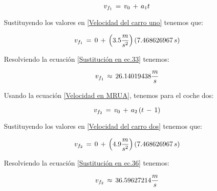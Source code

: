 \documentclass[letterpaper, 12pt]{article}
\begin{document}
\begin{enumerate}
\begin{enumerate}
            \begin{equation}
                \label{Velocidad del carro uno}
                v_{f_{1}} \thinspace = \thinspace v_{0} \thinspace + \thinspace a_{1}t 
            \end{equation}
            
            Sustituyendo los valores en \ref{Velocidad del carro uno} tenemos que:
            
            \begin{equation}
                \label{Sustitución en ec.33}
                v_{f_{1}} \thinspace = \thinspace 0 \thinspace + \thinspace \left(3.5 \frac{m}{s^{2}} \right) \left(7.468626967 \thinspace s \right)
            \end{equation}
            
            Resolviendo la ecuación \ref{Sustitución en ec.33} tenemos: 
            
            \begin{equation}
                \label{Solución numerica para coche 1}
                v_{f_{1}} \thinspace \approx \thinspace 26.14019438 \frac{m}{s}
            \end{equation}
            
             Usando la ecuación \ref{Velocidad en MRUA}, tenemos para el coche dos: 
            
            \begin{equation}
                \label{Velocidad del carro dos}
                v_{f_{2}} \thinspace = \thinspace v_{0} \thinspace + \thinspace a_{2}\left(t \thinspace - \thinspace 1 \right) 
            \end{equation}
            
            Sustituyendo los valores en \ref{Velocidad del carro dos} tenemos que:
            
            \begin{equation}
                \label{Sustitución en ec.36}
                v_{f_{2}} \thinspace = \thinspace 0 \thinspace + \thinspace \left(4.9 \frac{m}{s^{2}} \right) \left(7.468626967 \thinspace s \right)
            \end{equation}
            
            Resolviendo la ecuación \ref{Sustitución en ec.36} tenemos: 
            
            \begin{equation}
                \label{Solución numerica para coche 2}
                v_{f_{2}} \thinspace \approx \thinspace 36.59627214 \frac{m}{s}
            \end{equation}
            

\end{enumerate}
\end{enumerate}
\end{document}
